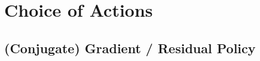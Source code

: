 \section{Choice of Actions}
\label{suppsec:policies}



\subsection{(Conjugate) Gradient / Residual Policy}
\label{suppsec:cg-policy}


